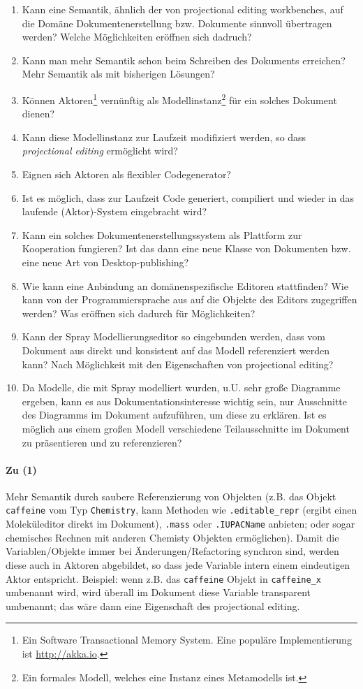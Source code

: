 \begin{enumerate}
    \item Kann eine Semantik, ähnlich der von projectional editing workbenches, auf die Domäne Dokumentenerstellung bzw. Dokumente sinnvoll übertragen werden? Welche Möglichkeiten eröffnen sich dadruch?
    \item Kann man mehr Semantik schon beim Schreiben des Dokuments erreichen? Mehr Semantik als mit bisherigen Lösungen?
    \item Können Aktoren\footnote{Ein Software Transactional Memory System. Eine populäre Implementierung ist \url{http://akka.io}.} vernünftig als Modellinstanz\footnote{Ein formales Modell, welches eine Instanz eines Metamodells ist.} für ein solches Dokument dienen?
    \item Kann diese Modellinstanz zur Laufzeit modifiziert werden, so dass \emph{projectional editing} ermöglicht wird?
    \item Eignen sich Aktoren als flexibler Codegenerator?
    \item Ist es möglich, dass zur Laufzeit Code generiert, compiliert und wieder in das laufende (Aktor)-System eingebracht wird?
    \item Kann ein solches Dokumentenerstellungssystem als Plattform zur Kooperation fungieren? Ist das dann eine neue Klasse von Dokumenten bzw. eine neue Art von Desktop-publishing?
    \item Wie kann eine Anbindung an domänenspezifische Editoren stattfinden? Wie kann von der Programmiersprache aus auf die Objekte des Editors zugegriffen werden? Was eröffnen sich dadurch für Möglichkeiten?
    \item Kann der Spray Modellierungseditor so eingebunden werden, dass vom Dokument aus direkt und konsistent auf das Modell referenziert werden kann? Nach Möglichkeit mit den Eigenschaften von projectional editing?
    \item Da Modelle, die mit Spray modelliert wurden, u.U. sehr große Diagramme ergeben, kann es aus Dokumentationsinteresse wichtig sein, nur Ausschnitte des Diagramms im Dokument aufzuführen, um diese zu erklären. Ist es möglich aus einem großen Modell verschiedene Teilausschnitte im Dokument zu präsentieren und zu referenzieren?
\end{enumerate}

\paragraph{Zu (1)} Mehr Semantik durch saubere Referenzierung von Objekten (z.B. das Objekt {\tt caffeine} vom Typ {\tt Chemistry}, kann Methoden wie {\tt .editable\_repr} (ergibt einen Moleküleditor direkt im Dokument), {\tt .mass} oder {\tt .IUPACName} anbieten; oder sogar chemisches Rechnen mit anderen Chemisty Objekten ermöglichen).
Damit die Variablen/Objekte immer bei Änderungen/Refactoring synchron sind, werden diese auch in Aktoren abgebildet, so dass jede Variable intern einem eindeutigen Aktor entspricht. Beispiel: wenn z.B. das {\tt caffeine} Objekt in {\tt caffeine\_x} umbenannt wird, wird überall im Dokument diese Variable transparent umbenannt; das wäre dann eine Eigenschaft des projectional editing.

